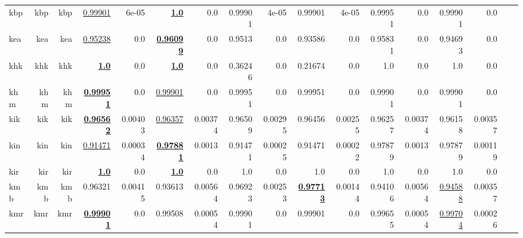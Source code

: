 \documentclass[11pt]{article}
\begin{document}
\begin{table*}[h]
{\begin{tabular}{lrrrrrrrrrrrrrrrr}
kbp         & kbp         & kbp         & \underline{0.99901}         & 6e-05         & \textbf{\underline{1.0}}         & 0.0         & 0.99901         & 4e-05         & 0.99901         & 4e-05         & 0.99951         & 0.0         & 0.99901         & 0.0         \\
kea         & kea         & kea         & \underline{0.95238}         & 0.0         & \textbf{\underline{0.96099}}         & 0.0         & 0.9513         & 0.0         & 0.93586         & 0.0         & 0.95831         & 0.0         & 0.94693         & 0.0         \\
khk         & khk         & khk         & \textbf{\underline{1.0}}         & 0.0         & \textbf{\underline{1.0}}         & 0.0         & 0.36246         & 0.0         & 0.21674         & 0.0         & 1.0         & 0.0         & 1.0         & 0.0         \\
khm         & khm         & khm         & \textbf{\underline{0.99951}}         & 0.0         & \underline{0.99901}         & 0.0         & 0.99951         & 0.0         & 0.99951         & 0.0         & 0.99901         & 0.0         & 0.99901         & 0.0         \\
kik         & kik         & kik         & \textbf{\underline{0.96562}}         & 0.00403         & \underline{0.96357}         & 0.00374         & 0.96509         & 0.00295         & 0.96456         & 0.00255         & 0.96257         & 0.00374         & 0.96158         & 0.00357         \\
kin         & kin         & kin         & \underline{0.91471}         & 0.00034         & \textbf{\underline{0.97881}}         & 0.0013         & 0.91471         & 0.00025         & 0.91471         & 0.00022         & 0.97879         & 0.0013         & 0.97879         & 0.00119         \\
kir         & kir         & kir         & \textbf{\underline{1.0}}         & 0.0         & \textbf{\underline{1.0}}         & 0.0         & 1.0         & 0.0         & 1.0         & 0.0         & 1.0         & 0.0         & 1.0         & 0.0         \\
kmb         & kmb         & kmb         & 0.96321         & 0.00415         & 0.93613         & 0.00564         & 0.96923         & 0.00253         & \textbf{\underline{0.97713}}         & 0.00144         & 0.94106         & 0.00564         & \underline{0.94588}         & 0.00357         \\
kmr         & kmr         & kmr         & \textbf{\underline{0.99901}}         & 0.0         & 0.99508         & 0.00054         & 0.99901         & 0.0         & 0.99901         & 0.0         & 0.99655         & 0.00054         & \underline{0.99704}         & 0.00026         \\

\end{tabular}}
\end{table*}
\end{document}
